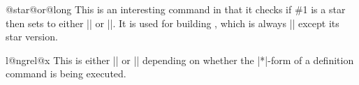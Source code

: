 \begin{docCommand}{@star@or@long} {  }
This is an interesting command in that it checks if \#1 is a star then sets  to either |\long| or |\relax|. It is used for building , which is always |\long| except its star version.
\end{docCommand}

\begin{teX}
\def\@star@or@long#1{%
  \@ifstar
   {\let\l@ngrel@x\relax#1}%
   {\let\l@ngrel@x\long#1}}
\end{teX}

%

\begin{docCommand}{l@ngrel@x}{ }
 This is either |\relax| or |\long| depending on whether the |*|-form
 of a definition command is being executed.
\end{docCommand}
\begin{teX}
\let\l@ngrel@x\relax
\end{teX}

